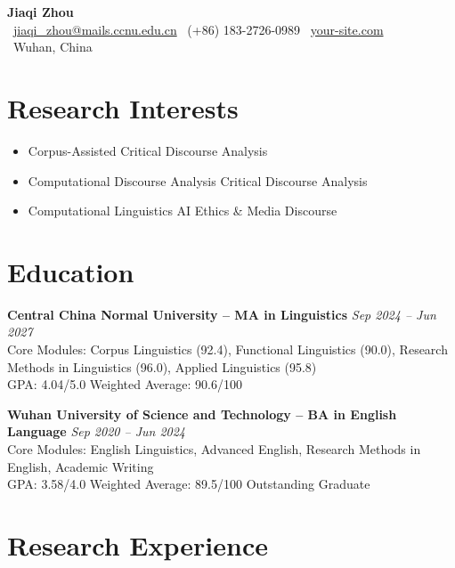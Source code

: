 \documentclass[10pt,a4paper]{article}
\newcommand{\cventry}[4]{
  \textbf{#1} \hfill \textit{\footnotesize #2} \\
  \footnotesize #3 \\
  \footnotesize #4
  \vspace{0.15em}
}
\begin{document}
\begin{center}
  {\Large\bfseries Jiaqi Zhou} \\[0.15em]

  \footnotesize
  \faEnvelope\ \href{mailto:jiaqi_zhou@mails.ccnu.edu.cn}{jiaqi\_zhou@mails.ccnu.edu.cn} \quad
  \faPhone\ (+86) 183-2726-0989 \quad
  \faGlobe\ \href{https://your-site.com}{your-site.com} \\[0.05em]
  \faMapMarker*\ Wuhan, China
\end{center}

\vspace{-0.3em}

\section{Research Interests}

\begin{itemize}
  \item Corpus-Assisted Critical Discourse Analysis
  \item Computational Discourse Analysis \quad\textbullet\quad Critical Discourse Analysis
  \item Computational Linguistics \quad\textbullet\quad AI Ethics \& Media Discourse
\end{itemize}

\section{Education}

\cventry{Central China Normal University -- MA in Linguistics}{Sep 2024 -- Jun 2027}
  {Core Modules: Corpus Linguistics (92.4), Functional Linguistics (90.0), Research Methods in Linguistics (96.0), Applied Linguistics (95.8)}
  {GPA: 4.04/5.0 \quad Weighted Average: 90.6/100}

\cventry{Wuhan University of Science and Technology -- BA in English Language}{Sep 2020 -- Jun 2024}
  {Core Modules: English Linguistics, Advanced English, Research Methods in English, Academic Writing}
  {GPA: 3.58/4.0 \quad Weighted Average: 89.5/100 \quad Outstanding Graduate}

\section{Research Experience}
\end{document}
